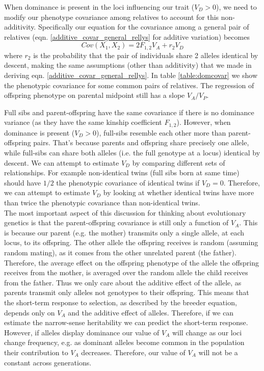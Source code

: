 When dominance is present in the loci influencing our trait ($V_D>0$), we need to modify our
phenotype covariance among relatives to account for this
non-additivity. Specifically our equation for the covariance among a
general pair of relatives
(eqn. \ref{additive_covar_general_rellys} for additive variation) becomes
\begin{equation}
 Cov(X_1,X_2) = 2 F_{1,2} V_A + r_2 V_D
\end{equation}
where $r_2$ is the probability that the pair of individuals share 2
alleles identical by descent, making the same assumptions (other than additivity) that we made in deriving
eqn. \ref{additive_covar_general_rellys}.  In table
\ref{table:domcovar} we show the phenotypic covariance for some common
pairs of relatives. The regression of offspring phenotype on parental
midpoint still has a slope $V_A/V_P$. 

Full sibs and parent-offspring have the same
covariance if there is no dominance variance (as they have the same
kinship coefficient $F_{1,2}$). However, when dominance
is present ($V_D>0$), full-sibs resemble each other more than
parent-offspring pairs. That's because parents and offspring share
precisely one allele, while full-sibs can share both alleles (i.e. the
full genotype at a locus) identical by descent. We can attempt to
estimate $V_D$ by comparing different sets of relationships. For
example non-identical twins (full sibs born at same time) 
should have $1/2$ the phenotypic covariance of identical twins if
$V_D=0$. Therefore, we can attempt to estimate $V_D$ by looking at
whether identical twins have more than twice the phenotypic covariance
than non-identical twins. \\

The most important aspect of this discussion for thinking about
evolutionary genetics is that the parent-offspring covariance is still
only a function of $V_A$. This is because our parent (e.g. the mother) transmits only a
single allele, at each locus, to its offspring. The other allele the
offspring receives is random (assuming random mating), as it comes
from the other unrelated parent (the father). Therefore, the average
effect on the offspring phenotype of
the allele the offspring receives from the mother, is averaged over
the random allele the child receives from the father. Thus we only
care about the additive effect of the allele, as parents transmit only
alleles not genotypes to their offspring. This means that the short-term response
to selection, as described by the breeder equation, depends only on
$V_A$ and the additive effect of alleles. Therefore, if we can
estimate the narrow-sense heritability we can predict the short-term response.
However, if alleles display dominance our value of $V_A$ will change
as our loci change frequency, e.g. as dominant alleles become common
in the population their contribution to $V_A$ decreases. Therefore,
our value of $V_A$ will not be a constant across generations.


